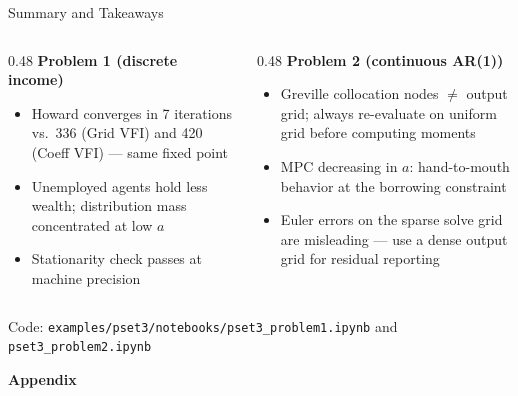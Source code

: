 \documentclass[aspectratio=169,11pt]{beamer}
\begin{document}
\begin{frame}{Summary and Takeaways}
    \begin{columns}[T]
        \begin{column}{0.48\textwidth}
            \textbf{Problem 1 (discrete income)}
            \begin{itemize}\setlength\itemsep{0.2em}
                \item Howard converges in 7 iterations vs.\ 336 (Grid VFI) and 420 (Coeff VFI) --- same fixed point
                \item Unemployed agents hold less wealth; distribution mass concentrated at low $a$
                \item Stationarity check passes at machine precision
            \end{itemize}
        \end{column}
        \begin{column}{0.48\textwidth}
            \textbf{Problem 2 (continuous AR(1))}
            \begin{itemize}\setlength\itemsep{0.2em}
                \item Greville collocation nodes $\ne$ output grid; always re-evaluate on uniform grid before computing moments
                \item MPC decreasing in $a$: hand-to-mouth behavior at the borrowing constraint
                \item Euler errors on the sparse solve grid are misleading --- use a dense output grid for residual reporting
            \end{itemize}
        \end{column}
    \end{columns}

    \vspace{0.5em}
    \centering
    \small
    Code: \texttt{examples/pset3/notebooks/pset3\_problem1.ipynb} and \texttt{pset3\_problem2.ipynb}
\end{frame}

\appendix

\begin{frame}[plain]
    \begin{center}
        {\Large \textbf{Appendix}}
    \end{center}
\end{frame}
\end{document}
